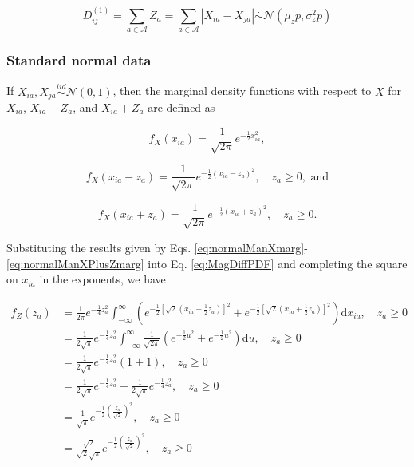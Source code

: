 \documentclass[10pt,letterpaper]{article}\usepackage[]{graphicx}\usepackage[]{color}
\begin{document}
\begin{equation}\label{eq:manhattanDistr}
D^{(1)}_{ij} = \sum_{a \in \mathcal{A}} Z_a = \sum_{a \in \mathcal{A}} |X_{ia} - X_{ja}| \overset{.}{\sim} \mathcal{N}\left(\mu_zp,\sigma^2_zp\right)
\end{equation}

\subsubsection{Standard normal data}

If $X_{ia},X_{ja} \overset{iid}{\sim} \mathcal{N}(0,1)$, then the marginal density functions with respect to $X$ for $X_{ia}$, $X_{ia} - Z_a$, and $X_{ia} + Z_a$ are defined as

\begin{equation}\label{eq:normalManXmarg}
f_X(x_{ia}) = \frac{1}{\sqrt{2\pi}}e^{-\frac{1}{2}x^2_{ia}},
\end{equation}

\begin{equation}\label{eq:normalManXMinusZmarg}
f_X(x_{ia} - z_a) = \frac{1}{\sqrt{2\pi}}e^{-\frac{1}{2}(x_{ia} - z_a)^2}, \quad z_a \geq 0, \text{ and}
\end{equation}

\begin{equation}\label{eq:normalManXPlusZmarg}
f_X(x_{ia} + z_a) = \frac{1}{\sqrt{2\pi}}e^{-\frac{1}{2}(x_{ia} + z_a)^2}, \quad z_a \geq 0.
\end{equation}

Substituting the results given by Eqs. \ref{eq:normalManXmarg}-\ref{eq:normalManXPlusZmarg} into Eq. \ref{eq:MagDiffPDF} and completing the square on $x_{ia}$ in the exponents, we have

\begin{equation}\label{eq:normalManPDF}
\begin{aligned}
f_Z(z_a) &= \frac{1}{2\pi}e^{-\frac{1}{4}z^2_a}\int_{-\infty}^{\infty}\left(e^{-\frac{1}{2}\left[\sqrt{2}\left(x_{ia} - \frac{1}{2}z_a\right)\right]^2} + e^{-\frac{1}{2}\left[\sqrt{2}\left(x_{ia} + \frac{1}{2}z_a\right)\right]^2}\right)\text{d}x_{ia}, \quad z_a \geq 0\\
&= \frac{1}{2\sqrt{\pi}}e^{-\frac{1}{4}z^2_a}\int_{-\infty}^{\infty}\frac{1}{\sqrt{2\pi}}\left(e^{-\frac{1}{2}u^2} + e^{-\frac{1}{2}u^2}\right)\text{d}u, \quad z_a \geq 0\\
&= \frac{1}{2\sqrt{\pi}}e^{-\frac{1}{4}z^2_a}(1 + 1), \quad z_a \geq 0\\
&= \frac{1}{2\sqrt{\pi}}e^{-\frac{1}{4}z^2_a} + \frac{1}{2\sqrt{\pi}}e^{-\frac{1}{4}z^2_a}, \quad z_a \geq 0 \\
&= \frac{1}{\sqrt{\pi}}e^{-\frac{1}{2}\left(\frac{z_a}{\sqrt{2}}\right)^2}, \quad z_a \geq 0 \\
&= \frac{\sqrt{2}}{\sqrt{2}\sqrt{\pi}} e^{-\frac{1}{2}\left(\frac{z_a}{\sqrt{2}}\right)^2}, \quad z_a \geq 0
\end{aligned}
\end{equation}
\end{document}

